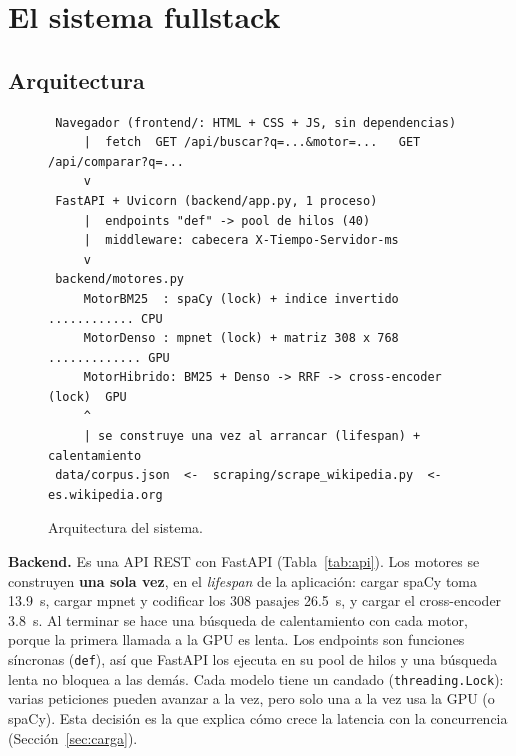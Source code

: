 \documentclass[11pt,letterpaper]{article}
\newcommand{\term}[1]{\texttt{#1}}
\begin{document}
\section{El sistema fullstack}

\subsection{Arquitectura}

\begin{figure}[H]
\centering
\small
\begin{verbatim}
 Navegador (frontend/: HTML + CSS + JS, sin dependencias)
     |  fetch  GET /api/buscar?q=...&motor=...   GET /api/comparar?q=...
     v
 FastAPI + Uvicorn (backend/app.py, 1 proceso)
     |  endpoints "def" -> pool de hilos (40)
     |  middleware: cabecera X-Tiempo-Servidor-ms
     v
 backend/motores.py
     MotorBM25  : spaCy (lock) + indice invertido ............ CPU
     MotorDenso : mpnet (lock) + matriz 308 x 768 ............. GPU
     MotorHibrido: BM25 + Denso -> RRF -> cross-encoder (lock)  GPU
     ^
     | se construye una vez al arrancar (lifespan) + calentamiento
 data/corpus.json  <-  scraping/scrape_wikipedia.py  <-  es.wikipedia.org
\end{verbatim}
\caption{Arquitectura del sistema.}
\label{fig:arq}
\end{figure}

\textbf{Backend.} Es una API REST con FastAPI (Tabla~\ref{tab:api}). Los motores se construyen \textbf{una sola vez}, en el \emph{lifespan} de la aplicación: cargar spaCy toma 13.9~s, cargar mpnet y codificar los 308 pasajes 26.5~s, y cargar el cross-encoder 3.8~s. Al terminar se hace una búsqueda de calentamiento con cada motor, porque la primera llamada a la GPU es lenta. Los endpoints son funciones síncronas (\term{def}), así que FastAPI los ejecuta en su pool de hilos y una búsqueda lenta no bloquea a las demás. Cada modelo tiene un candado (\term{threading.Lock}): varias peticiones pueden avanzar a la vez, pero solo una a la vez usa la GPU (o spaCy). Esta decisión es la que explica cómo crece la latencia con la concurrencia (Sección~\ref{sec:carga}).
\end{document}
